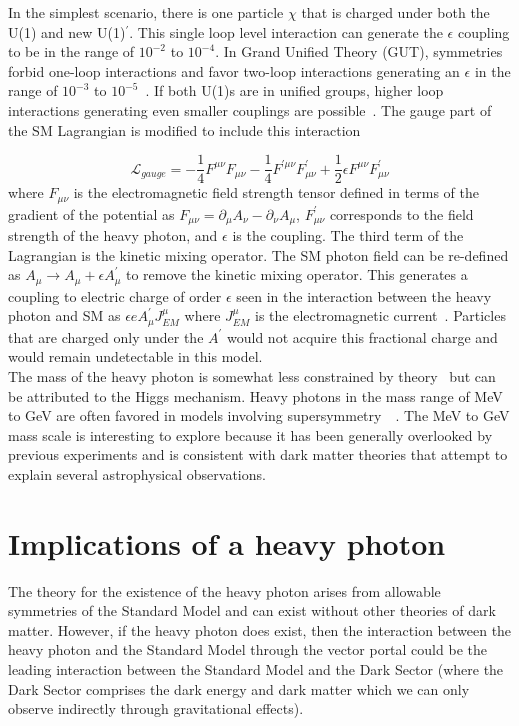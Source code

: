 In the simplest scenario, there is one particle $\chi$ that is charged under both the U(1) and new U(1)$^{\prime}$. This single loop level interaction can generate the $\epsilon$ coupling to be in the range of $10^{-2}$ to $10^{-4}$. In Grand Unified Theory (GUT), symmetries forbid one-loop interactions and favor two-loop interactions generating an $\epsilon$ in the range of $10^{-3}$ to $10^{-5}$~\cite{alexander_dark_2016}. If both U(1)s are in unified groups, higher loop interactions generating even smaller couplings are possible~\cite{goodsell_naturally_2009}. The gauge part of the SM Lagrangian is modified to include this interaction

\begin{equation}
	\label{eq:lagrangian}
\mathcal{L}_{gauge} = -\dfrac{1}{4}F^{\mu\nu}F_{\mu\nu}-\dfrac{1}{4}
F^{\prime\mu\nu}F^{\prime}_{\mu\nu}+\dfrac{1}{2}\epsilon F^{\mu\nu}F^{\prime}_{\mu\nu}
\end{equation}
where $F_{\mu\nu}$ is the electromagnetic field strength tensor defined in terms of the gradient of the potential as $F_{\mu\nu}=\partial_{\mu}A_{\nu}-\partial_{\nu}A_{\mu}$, $F^{\prime}_{\mu\nu}$ corresponds to the field strength of the heavy photon, and $\epsilon$ is the coupling. The third term of the Lagrangian is the kinetic mixing operator. The SM photon field can be re-defined as $A_{\mu}\rightarrow A_{\mu}+\epsilon A^{\prime}_{\mu}$ to remove the kinetic mixing operator. This generates a coupling to electric charge of order $\epsilon$ seen in the interaction between the heavy photon and SM as $\epsilon e A^{\prime}_{\mu}J^{\mu}_{EM}$ where $J^{\mu}_{EM}$ is the electromagnetic current~\cite{bjorken_new_2009}. Particles that are charged only under the $A^{\prime}$ would not acquire this fractional charge and would remain undetectable in this model. \\
\indent The mass of the heavy photon is somewhat less constrained by theory~\cite{essig_dark_2013} but can be attributed to the Higgs mechanism. Heavy photons in the mass range of MeV to GeV are often favored in models involving supersymmetry~\cite{arkani-hamed_lhc_2008}~\cite{baumgart_non-abelian_2009}. The MeV to GeV mass scale is interesting to explore because it has been generally overlooked by previous experiments and is consistent with dark matter theories that attempt to explain several astrophysical observations. 


\section{Implications of a heavy photon}
The theory for the existence of the heavy photon arises from allowable symmetries of the Standard Model and can exist without other theories of dark matter. However, if the heavy photon does exist, then the interaction between the heavy photon and the Standard Model through the vector portal could be  the leading interaction between the Standard Model and the Dark Sector (where the Dark Sector comprises the dark energy and dark matter which we can only observe indirectly through gravitational effects).

